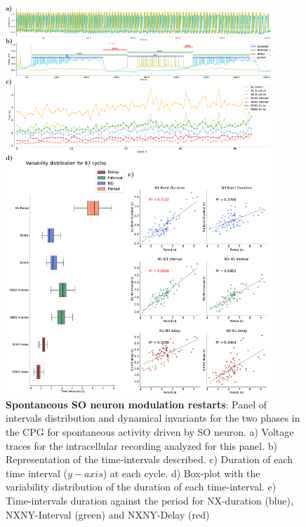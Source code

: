 \begin{figure}[htbp]
	\centering
	\includegraphics[width=0.9\textwidth]{./img/invariants/data/SUSSEX/prep4_so_driven_2/images/panel_with_intervals.pdf}
	\caption{\textbf{Spontaneous SO neuron modulation restarts}: Panel of intervals distribution and dynamical invariants for the two phases in the CPG for spontaneous activity driven by SO neuron. a) Voltage traces for the intracellular recording analyzed for this panel. b) Representation of the time-intervals described. c) Duration of each time interval ($y-axis$) at each cycle. d) Box-plot with the variability distribution of the duration of each time-interval. e) Time-intervals duration against the period for NX-duration (blue), NXNY-Interval (green) and NXNY-Delay (red)}
	\label{fig:so spontaneous invariants 1}
\end{figure}


